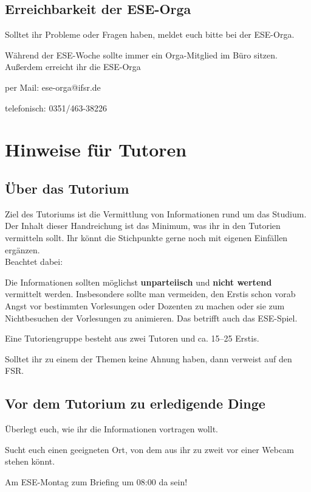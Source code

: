 \documentclass[a4paper,12pt]{scrreprt}
\begin{document}
\section*{Erreichbarkeit der ESE-Orga}

Solltet ihr Probleme oder Fragen haben, meldet euch bitte bei der ESE-Orga.

Während der ESE-Woche sollte immer ein Orga-Mitglied im Büro sitzen.
Außerdem erreicht ihr die ESE-Orga
\begin{itemize*}
    \item per Mail: ese-orga@ifsr.de
    \item telefonisch: 0351/463-38226
\end{itemize*}


\tableofcontents
\chapter{Hinweise für Tutoren}

\section{Über das Tutorium}
Ziel des Tutoriums ist die Vermittlung von Informationen rund um das Studium. Der Inhalt dieser Handreichung ist das Minimum, was ihr in den Tutorien vermitteln sollt. Ihr könnt die Stichpunkte gerne noch mit eigenen Einfällen ergänzen.\\
Beachtet dabei:
\begin{itemize*}
\item Die Informationen sollten möglichst \textbf{unparteiisch} und \textbf{nicht wertend} vermittelt werden.
Insbesondere sollte man vermeiden, den Erstis schon vorab Angst vor bestimmten Vorlesungen oder Dozenten zu machen oder sie zum Nichtbesuchen der Vorlesungen zu animieren. Das betrifft auch das ESE-Spiel.
\item Eine Tutoriengruppe besteht aus zwei Tutoren und ca. 15--25 Erstis.
\item Solltet ihr zu einem der Themen keine Ahnung haben, dann verweist auf den FSR\@.
\end{itemize*}

\section{Vor dem Tutorium zu erledigende Dinge}
\begin{itemize*}
    \item Überlegt euch, wie ihr die Informationen vortragen wollt.
    \item Sucht euch einen geeigneten Ort, von dem aus ihr zu zweit vor einer Webcam stehen könnt.
    \item Am ESE-Montag zum Briefing um 08:00 da sein!
\end{itemize*}
\end{document}
